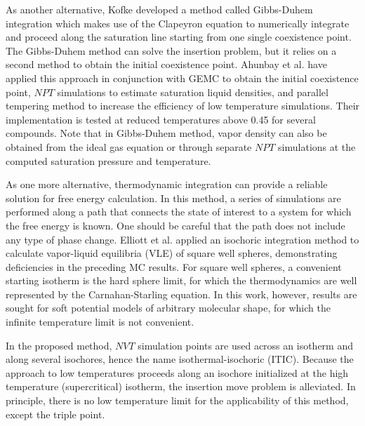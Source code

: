 \documentclass[5p,times]{elsarticle}
\begin{document}
As another alternative, Kofke \cite{Kofke1993b} developed a method called Gibbs-Duhem integration which makes use of the Clapeyron equation to numerically integrate and proceed along the saturation line starting from one single coexistence point. The Gibbs-Duhem method can solve the insertion problem, but it relies on a second method to obtain the initial coexistence point. Ahunbay et al. \cite{Ahunbay2004} have applied this approach in conjunction with GEMC 
to obtain the initial coexistence point, $NPT$ simulations to estimate saturation liquid densities, and parallel tempering method \cite{Yan1999} to increase the efficiency of low temperature simulations. Their implementation is tested at reduced temperatures above 0.45 for several compounds. Note that in Gibbs-Duhem method, vapor density can also be obtained from the ideal gas equation or through separate $NPT$ simulations at the computed saturation pressure and temperature.


As one more alternative, thermodynamic integration can provide a reliable solution for free energy calculation. In this method, a series of simulations are performed along a path that connects the state of interest to a system for which the free energy is known. One should be careful that the path does not include any type of phase change\cite{Vega2009}. Elliott et al. \cite{Elliott1999a} applied an isochoric integration method to calculate vapor-liquid equilibria (VLE) of square well spheres, demonstrating deficiencies in the preceding MC results.  For square well spheres, a convenient starting isotherm is the hard sphere limit, for which the thermodynamics are well represented by the Carnahan-Starling equation\cite{Carnahan1969a}. In this work, however, results are sought for soft potential models of arbitrary molecular shape, for which the infinite temperature limit is not convenient. 

In the proposed method, $NVT$ simulation points are used across an isotherm and along several isochores, hence the name isothermal-isochoric (ITIC). Because the approach to low temperatures proceeds along an isochore initialized at the high temperature (supercritical) isotherm, the insertion move problem is alleviated. In principle, there is no low temperature limit for the applicability of this method, except the triple point. 
\end{document}
